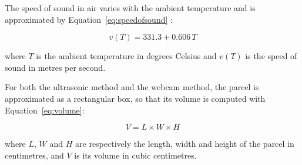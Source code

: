 The speed of sound in air varies with the ambient temperature and is approximated by Equation~\eqref{eq:speedofsound} \cite{openstax_sound}:

\begin{equation}
\label{eq:speedofsound}
v(T) = 331.3 + 0.606\,T
\end{equation}

where $T$ is the ambient temperature in degrees Celsius and $v(T)$ is the speed of sound in metres per second.

For both the ultrasonic method and the webcam method, the parcel is approximated as a rectangular box, so that its volume is computed with Equation~\eqref{eq:volume}:

\begin{equation}
\label{eq:volume}
V = L \times W \times H
\end{equation}

where $L$, $W$ and $H$ are respectively the length, width and height of the parcel in centimetres, and $V$ is its volume in cubic centimetres.
